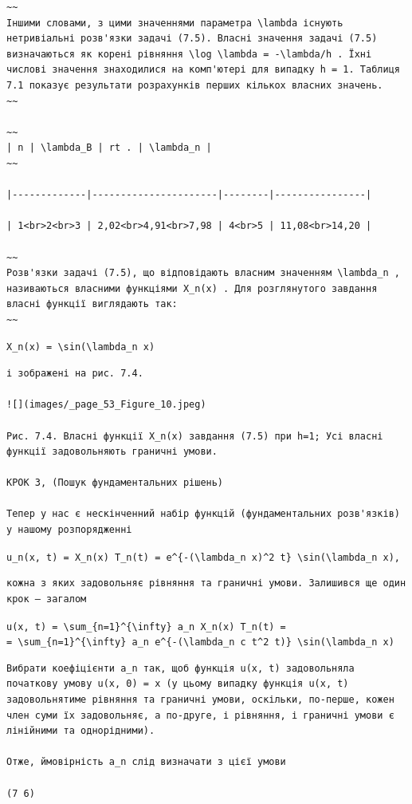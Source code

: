\documentclass[
  ukrainian,
]{article}
\begin{document}
\begin{verbatim}
~~
Іншими словами, з цими значеннями параметра \lambda існують нетривіальні розв'язки задачі (7.5). Власні значення задачі (7.5) визначаються як корені рівняння \log \lambda = -\lambda/h . Їхні числові значення знаходилися на комп'ютері для випадку h = 1. Таблиця 7.1 показує результати розрахунків перших кількох власних значень.
~~

~~
| n | \lambda_B | rt . | \lambda_n |
~~

|-------------|----------------------|--------|----------------|

| 1<br>2<br>3 | 2,02<br>4,91<br>7,98 | 4<br>5 | 11,08<br>14,20 |

~~
Розв'язки задачі (7.5), що відповідають власним значенням \lambda_n , називаються власними функціями X_n(x) . Для розглянутого завдання власні функції виглядають так:
~~
\end{verbatim}

\texttt{X\_n(x)\ =\ \textbackslash{}sin(\textbackslash{}lambda\_n\ x)}

\begin{verbatim}
і зображені на рис. 7.4.

![](images/_page_53_Figure_10.jpeg)

Рис. 7.4. Власні функції X_n(x) завдання (7.5) при h=1; Усі власні функції задовольняють граничні умови.

КРОК 3, (Пошук фундаментальних рішень)

Тепер у нас є нескінченний набір функцій (фундаментальних розв'язків) у нашому розпорядженні
\end{verbatim}

\texttt{u\_n(x,\ t)\ =\ X\_n(x)\ T\_n(t)\ =\ e\^{}\{-(\textbackslash{}lambda\_n\ x)\^{}2\ t\}\ \textbackslash{}sin(\textbackslash{}lambda\_n\ x),}

\begin{verbatim}
кожна з яких задовольняє рівняння та граничні умови. Залишився ще один крок — загалом
\end{verbatim}

\texttt{u(x,\ t)\ =\ \textbackslash{}sum\_\{n=1\}\^{}\{\textbackslash{}infty\}\ a\_n\ X\_n(x)\ T\_n(t)\ =}
\texttt{=\ \textbackslash{}sum\_\{n=1\}\^{}\{\textbackslash{}infty\}\ a\_n\ e\^{}\{-(\textbackslash{}lambda\_n\ c\ t\^{}2\ t)\}\ \textbackslash{}sin(\textbackslash{}lambda\_n\ x)}

\begin{verbatim}
Вибрати коефіцієнти a_n так, щоб функція u(x, t) задовольняла початкову умову u(x, 0) = x (у цьому випадку функція u(x, t) задовольнятиме рівняння та граничні умови, оскільки, по-перше, кожен член суми їх задовольняє, а по-друге, і рівняння, і граничні умови є лінійними та однорідними).

Отже, ймовірність a_n слід визначати з цієї умови

(7 6)
\end{verbatim}
\end{document}
